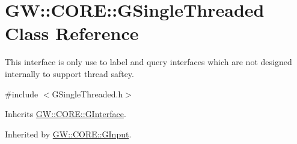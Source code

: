 \hypertarget{class_g_w_1_1_c_o_r_e_1_1_g_single_threaded}{}\section{GW\+:\+:C\+O\+RE\+:\+:G\+Single\+Threaded Class Reference}
\label{class_g_w_1_1_c_o_r_e_1_1_g_single_threaded}


This interface is only use to label and query interfaces which are not designed internally to support thread saftey.  




{\ttfamily \#include $<$G\+Single\+Threaded.\+h$>$}



Inherits \hyperlink{class_g_w_1_1_c_o_r_e_1_1_g_interface}{G\+W\+::\+C\+O\+R\+E\+::\+G\+Interface}.



Inherited by \hyperlink{class_g_w_1_1_c_o_r_e_1_1_g_input}{G\+W\+::\+C\+O\+R\+E\+::\+G\+Input}.

